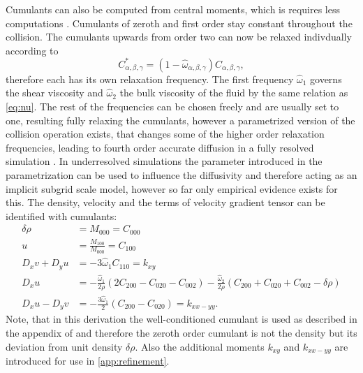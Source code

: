 Cumulants can also be computed from central moments, which is requires less computations \cite{geier_cumulant_2015}. Cumulants of zeroth and first order stay constant throughout the collision. The cumulants upwards from order two can now be relaxed indivdually according to
\begin{equation}
	C_{\alpha, \beta, \gamma}^* = \left(1-\hat{\omega}_{\alpha,\beta,\gamma}\right) C_{\alpha, \beta, \gamma}, \label{eq:relax}
\end{equation}
therefore each has its own relaxation frequency. The first frequency $\hat{\omega}_1$ governs the shear viscosity and $\hat{\omega}_2$ the bulk viscosity of the fluid by the same relation as \eqref{eq:nu}. The rest of the frequencies can be chosen freely and are usually set to one, resulting fully relaxing the cumulants, however a parametrized version of the collision operation exists, that changes some of the higher order relaxation frequencies, leading to fourth order accurate diffusion in a fully resolved simulation \cite{geier_parametrization_2017}. In underresolved simulations the parameter introduced in the parametrization can be used to influence the diffusivity and therefore acting as an implicit subgrid scale model, however so far only empirical evidence exists for this.\cite{geier_cumulant_2015} 
The density, velocity and the terms of velocity gradient tensor can be identified with cumulants:
\begin{align}
\delta \rho &= M_{000} = C_{000} \label{eq:drho}\\
u &= \frac{M_{100}}{M_{000}} =  C_{100}\\
D_x v + D_y u &= -3 \hat{\omega}_1 C_{110} = k_{xy} \label{eq:derivate1}\\
D_x u &= - \frac{\hat{\omega}_1}{2 \rho}\left(2 C_{200} - C_{020} - C_{002} \right) - \frac{\hat{\omega}_2}{2 \rho} \left(C_{200} + C_{020} + C_{002} - \delta \rho \right) \\
D_x u - D_y v &= - \frac{3\hat{\omega}_1}{2} \left(C_{200} - C_{020}\right) = k_{xx-yy}. \label{eq:derivative2}
\end{align} Note, that in this derivation the well-conditioned cumulant is used as described in the appendix of \cite{geier_cumulant_2015} and therefore the zeroth order cumulant is not the density but its deviation from unit density $\delta \rho$. Also the additional moments $k_{xy}$ and $k_{xx-yy}$ are introduced for use in \autoref{app:refinement}.
